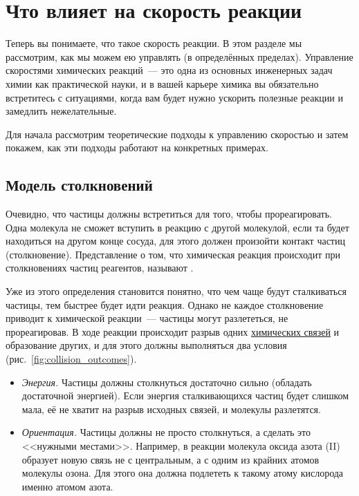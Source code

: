 \clearpage

\section{Что влияет на скорость реакции}

Теперь вы понимаете, что такое скорость реакции. В этом разделе мы рассмотрим, как мы можем ею управлять (в определённых пределах). Управление скоростями химических реакций~--- это одна из основных инженерных задач химии как практической науки, и в вашей карьере химика вы обязательно встретитесь с ситуациями, когда вам будет нужно ускорить полезные реакции и замедлить нежелательные.

Для начала рассмотрим теоретические подходы к управлению скоростью и затем покажем, как эти подходы работают на конкретных примерах.

\subsection*{Модель столкновений}

Очевидно, что частицы должны встретиться для того, чтобы прореагировать. Одна молекула не сможет вступить в реакцию с другой молекулой, если та будет находиться на другом конце сосуда, для этого должен произойти контакт частиц (столкновение). Представление о том, что химическая реакция происходит при столкновениях частиц реагентов, называют .

Уже из этого определения становится понятно, что чем чаще будут сталкиваться частицы, тем быстрее будет идти реакция. Однако не каждое столкновение приводит к химической реакции~--- частицы могут разлететься, не прореагировав. В ходе реакции происходит разрыв одних \hyperref[sec:introduction_to_chemical_bonding]{химических связей} и образование других, и для этого должны выполняться два условия (рис.~\ref{fig:collision_outcomes}).

\begin{itemize}
    \item \emph{Энергия.} Частицы должны столкнуться достаточно сильно (обладать достаточной энергией). Если энергия сталкивающихся частиц будет слишком мала, её не хватит на разрыв исходных связей, и молекулы разлетятся.
    \item \emph{Ориентация.} Частицы должны не просто столкнуться, а сделать это <<нужными местами>>. Например, в реакции  молекула оксида азота (II) образует новую связь  не с центральным, а с одним из крайних атомов молекулы озона. Для этого она должна подлететь к такому атому кислорода именно атомом азота.
\end{itemize}

